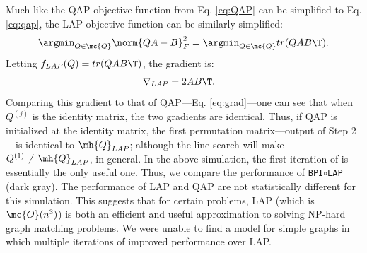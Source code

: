 \documentclass[10pt,journal,cspaper,compsoc]{IEEEtran}
\begin{document}
Much like the QAP objective function from Eq. \eqref{eq:QAP} can be simplified to Eq. \eqref{eq:qap}, the LAP objective function can be similarly simplified:
\begin{align}
	\argmin_{Q \in \mc{Q}} \norm{QA-B}_F^2 = \argmin_{Q \in \mc{Q}} tr(QA B\T).
\end{align}
Letting $f_{LAP}(Q)=tr(QA B\T)$, the gradient is:
\begin{align}
	\nabla_{LAP}&=2A B\T.
\end{align}
Comparing this gradient to that of QAP---Eq. \eqref{eq:grad}---one can see that when $Q^{(j)}$ is the identity matrix, the two gradients are identical.  Thus, if QAP is initialized at the identity matrix, the first permutation matrix---output of Step 2---is identical to $\mh{Q}_{LAP}$; although the line search will make $Q^{(1)} \neq \mh{Q}_{LAP}$, in general.  %
In the above simulation, the first iteration of \qap is essentially the only useful one.  Thus, we compare the performance of \texttt{BPI}$\circ$\texttt{LAP} (dark gray).  The performance of LAP and QAP are not statistically different for this simulation.  This suggests that for certain problems, LAP (which is $\mc{O}(n^3)$) is both an efficient and useful approximation to solving NP-hard graph matching problems. We were unable to find a model for simple graphs in which multiple iterations of \qap improved performance over LAP. %
\end{document}
